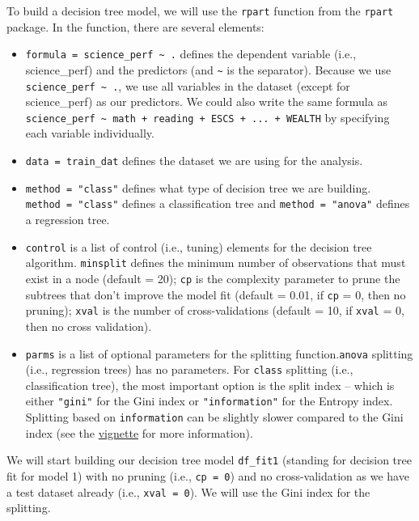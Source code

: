 \documentclass[]{book}
\providecommand{\tightlist}{%
  \setlength{\itemsep}{0pt}\setlength{\parskip}{0pt}}
\begin{document}
To build a decision tree model, we will use the \texttt{rpart} function from the \texttt{rpart} package. In the function, there are several elements:

\begin{itemize}
\tightlist
\item
  \texttt{formula\ =\ science\_perf\ \textasciitilde{}\ .} defines the dependent variable (i.e., science\_perf) and the predictors (and \texttt{\textasciitilde{}} is the separator). Because we use \texttt{science\_perf\ \textasciitilde{}\ .}, we use all variables in the dataset (except for science\_perf) as our predictors. We could also write the same formula as \texttt{science\_perf\ \textasciitilde{}\ math\ +\ reading\ +\ ESCS\ +\ ...\ +\ WEALTH} by specifying each variable individually.
\item
  \texttt{data\ =\ train\_dat} defines the dataset we are using for the analysis.
\item
  \texttt{method\ =\ "class"} defines what type of decision tree we are building. \texttt{method\ =\ "class"} defines a classification tree and \texttt{method\ =\ "anova"} defines a regression tree.
\item
  \texttt{control} is a list of control (i.e., tuning) elements for the decision tree algorithm. \texttt{minsplit} defines the minimum number of observations that must exist in a node (default = 20); \texttt{cp} is the complexity parameter to prune the subtrees that don't improve the model fit (default = 0.01, if \texttt{cp} = 0, then no pruning); \texttt{xval} is the number of cross-validations (default = 10, if \texttt{xval} = 0, then no cross validation).
\item
  \texttt{parms} is a list of optional parameters for the splitting function.\texttt{anova} splitting (i.e., regression trees) has no parameters. For \texttt{class} splitting (i.e., classification tree), the most important option is the split index -- which is either \texttt{"gini"} for the Gini index or \texttt{"information"} for the Entropy index. Splitting based on \texttt{information} can be slightly slower compared to the Gini index (see the \href{https://cran.r-project.org/web/packages/rpart/vignettes/longintro.pdf}{vignette} for more information).
\end{itemize}

We will start building our decision tree model \texttt{df\_fit1} (standing for decision tree fit for model 1) with no pruning (i.e., \texttt{cp\ =\ 0}) and no cross-validation as we have a test dataset already (i.e., \texttt{xval\ =\ 0}). We will use the Gini index for the splitting.
\end{document}
